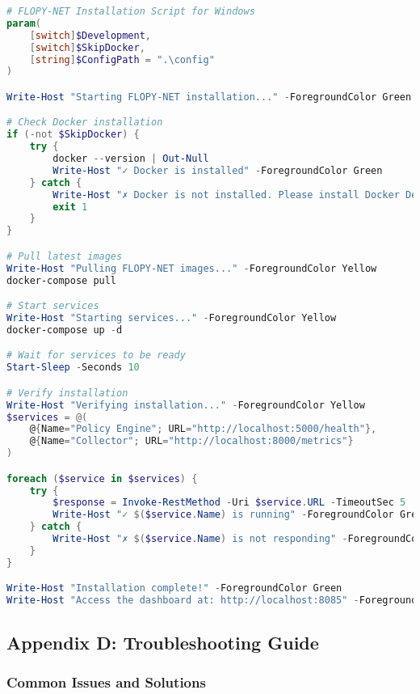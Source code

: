 \documentclass[12pt,a4paper,twoside]{article}
\begin{document}
\begin{lstlisting}[language=powershell, caption=Windows Installation Script]
# FLOPY-NET Installation Script for Windows
param(
    [switch]$Development,
    [switch]$SkipDocker,
    [string]$ConfigPath = ".\config"
)

Write-Host "Starting FLOPY-NET installation..." -ForegroundColor Green

# Check Docker installation
if (-not $SkipDocker) {
    try {
        docker --version | Out-Null
        Write-Host "✓ Docker is installed" -ForegroundColor Green
    } catch {
        Write-Host "✗ Docker is not installed. Please install Docker Desktop." -ForegroundColor Red
        exit 1
    }
}

# Pull latest images
Write-Host "Pulling FLOPY-NET images..." -ForegroundColor Yellow
docker-compose pull

# Start services
Write-Host "Starting services..." -ForegroundColor Yellow
docker-compose up -d

# Wait for services to be ready
Start-Sleep -Seconds 10

# Verify installation
Write-Host "Verifying installation..." -ForegroundColor Yellow
$services = @(
    @{Name="Policy Engine"; URL="http://localhost:5000/health"},
    @{Name="Collector"; URL="http://localhost:8000/metrics"}
)

foreach ($service in $services) {
    try {
        $response = Invoke-RestMethod -Uri $service.URL -TimeoutSec 5
        Write-Host "✓ $($service.Name) is running" -ForegroundColor Green
    } catch {
        Write-Host "✗ $($service.Name) is not responding" -ForegroundColor Red
    }
}

Write-Host "Installation complete!" -ForegroundColor Green
Write-Host "Access the dashboard at: http://localhost:8085" -ForegroundColor Cyan
\end{lstlisting}

\subsection{Appendix D: Troubleshooting Guide}

\subsubsection{Common Issues and Solutions}
\end{document}
